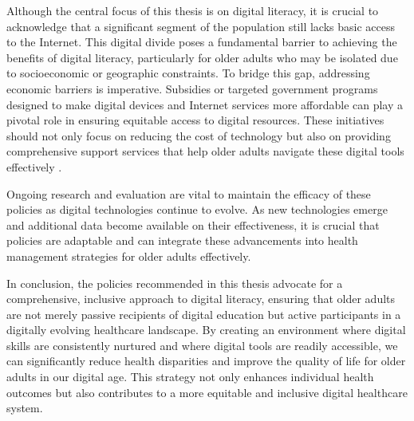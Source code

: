 Although the central focus of this thesis is on digital literacy, it is crucial to acknowledge that a significant segment of the population still lacks basic access to the Internet. This digital divide poses a fundamental barrier to achieving the benefits of digital literacy, particularly for older adults who may be isolated due to socioeconomic or geographic constraints. To bridge this gap, addressing economic barriers is imperative. Subsidies or targeted government programs designed to make digital devices and Internet services more affordable can play a pivotal role in ensuring equitable access to digital resources. These initiatives should not only focus on reducing the cost of technology but also on providing comprehensive support services that help older adults navigate these digital tools effectively \parencite{makri_bridging_2019}.

Ongoing research and evaluation are vital to maintain the efficacy of these policies as digital technologies continue to evolve. As new technologies emerge and additional data become available on their effectiveness, it is crucial that policies are adaptable and can integrate these advancements into health management strategies for older adults effectively.

In conclusion, the policies recommended in this thesis advocate for a comprehensive, inclusive approach to digital literacy, ensuring that older adults are not merely passive recipients of digital education but active participants in a digitally evolving healthcare landscape. By creating an environment where digital skills are consistently nurtured and where digital tools are readily accessible, we can significantly reduce health disparities and improve the quality of life for older adults in our digital age. This strategy not only enhances individual health outcomes but also contributes to a more equitable and inclusive digital healthcare system.
